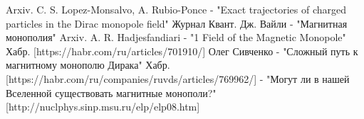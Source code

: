 \documentclass[a4paper, 12pt]{article}
\begin{document}
\newpage
 
 
\begin{thebibliography}{}
    \bibitem{}  Arxiv. C. S. Lopez-Monsalvo, A. Rubio-Ponce  -  "Exact trajectories of charged particles in the Dirac
    monopole field"
    \bibitem{}  Журнал Квант. Дж. Вайли  -  "Магнитная монополия"
    \bibitem{}  Arxiv. A. R. Hadjesfandiari  -  "1
    Field of the Magnetic Monopole"
    \bibitem{}  Хабр. [https://habr.com/ru/articles/701910/] Олег Сивченко  -  "Сложный путь к магнитному монополю Дирака"
    \bibitem{}  Хабр. [https://habr.com/ru/companies/ruvds/articles/769962/] - "Могут ли в нашей Вселенной существовать магнитные монополи?"
    \bibitem{} [http://nuclphys.sinp.msu.ru/elp/elp08.htm]

\end{thebibliography}
\end{document}
